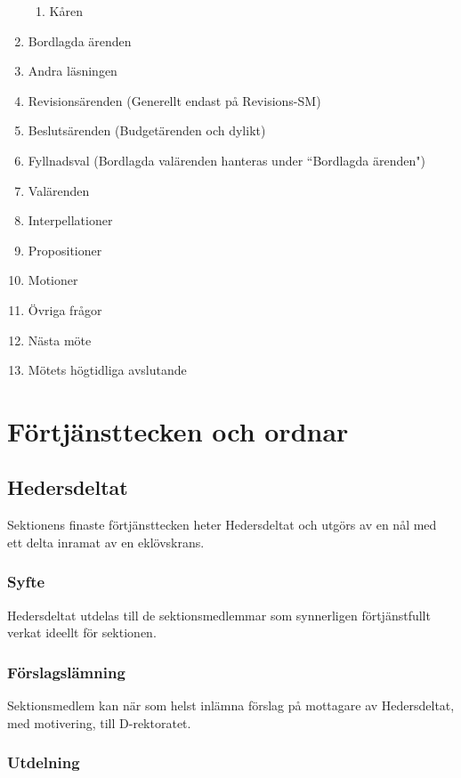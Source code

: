 \documentclass[a4paper,12pt]{article}
\begin{document}
\begin{enumerate}
\begin{enumerate}
  \item Kåren
\end{enumerate}


  \item Bordlagda ärenden
  \item Andra läsningen
  \item Revisionsärenden (Generellt endast på Revisions-SM)
  \item Beslutsärenden (Budgetärenden och dylikt)
  \item Fyllnadsval (Bordlagda valärenden hanteras under ``Bordlagda ärenden")
  \item Valärenden
  \item Interpellationer
  \item Propositioner
  \item Motioner
  \item Övriga frågor
  \item Nästa möte
  \item Mötets högtidliga avslutande
\end{enumerate}

\section{Förtjänsttecken och ordnar}

\subsection{Hedersdeltat}

Sektionens finaste förtjänsttecken heter Hedersdeltat och utgörs av en nål med ett delta inramat av en eklövskrans.

\subsubsection{Syfte}

Hedersdeltat utdelas till de sektionsmedlemmar som synnerligen förtjänstfullt verkat ideellt för sektionen.

\subsubsection{Förslagslämning}

Sektionsmedlem kan när som helst inlämna förslag på mottagare av Hedersdeltat, med motivering, till D-rektoratet.

\subsubsection{Utdelning}
\end{document}
